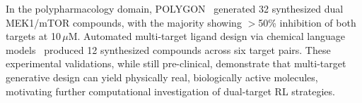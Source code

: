 In the polypharmacology domain, POLYGON~\citep{ren2024polygon}
generated 32 synthesized dual MEK1/mTOR compounds, with the majority
showing $>$50\% inhibition of both targets at 10\,$\mu$M.
Automated multi-target ligand design via chemical language
models~\citep{zhang2024clm} produced 12 synthesized compounds across
six target pairs.
These experimental validations, while still pre-clinical, demonstrate
that multi-target generative design can yield physically real,
biologically active molecules, motivating further computational
investigation of dual-target RL strategies.
